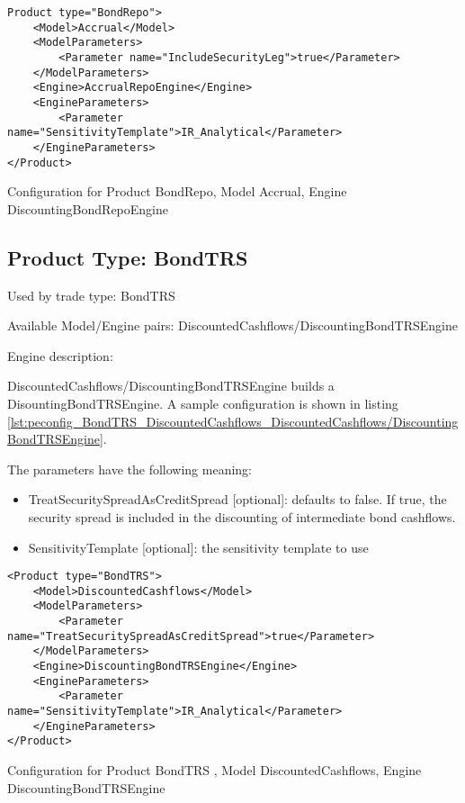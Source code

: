 \begin{longlisting}
\begin{verbatim}
Product type="BondRepo">
    <Model>Accrual</Model>
    <ModelParameters>
        <Parameter name="IncludeSecurityLeg">true</Parameter>
    </ModelParameters>
    <Engine>AccrualRepoEngine</Engine>
    <EngineParameters>
        <Parameter name="SensitivityTemplate">IR_Analytical</Parameter>
    </EngineParameters>
</Product>
\end{verbatim}
\caption{Configuration for Product BondRepo, Model Accrual, Engine DiscountingBondRepoEngine}
\label{lst:peconfig_BondRepo_Accrual_AccrualBondRepoEngine}
\end{longlisting}

\subsection{Product Type: BondTRS}

Used by trade type: BondTRS

Available Model/Engine pairs: DiscountedCashflows/DiscountingBondTRSEngine

Engine description:

DiscountedCashflows/DiscountingBondTRSEngine builds a DisountingBondTRSEngine. A sample configuration is shown in listing \ref{lst:peconfig_BondTRS_DiscountedCashflows_DiscountedCashflows/DiscountingBondTRSEngine}.

The parameters have the following meaning:

\begin{itemize}
\item TreatSecuritySpreadAsCreditSpread [optional]: defaults to false. If true, the security spread is included in the
  discounting of intermediate bond cashflows.
\item SensitivityTemplate [optional]: the sensitivity template to use 
\end{itemize}

\begin{longlisting}
\begin{verbatim}
<Product type="BondTRS">
    <Model>DiscountedCashflows</Model>
    <ModelParameters>
        <Parameter name="TreatSecuritySpreadAsCreditSpread">true</Parameter>
    </ModelParameters>
    <Engine>DiscountingBondTRSEngine</Engine>
    <EngineParameters>
        <Parameter name="SensitivityTemplate">IR_Analytical</Parameter>
    </EngineParameters>
</Product>
\end{verbatim}
\caption{Configuration for Product BondTRS , Model DiscountedCashflows, Engine DiscountingBondTRSEngine}
\label{lst:peconfig_BondTRS_DiscountedCashflows_DiscountedCashflows/DiscountingBondTRSEngine}
\end{longlisting}

